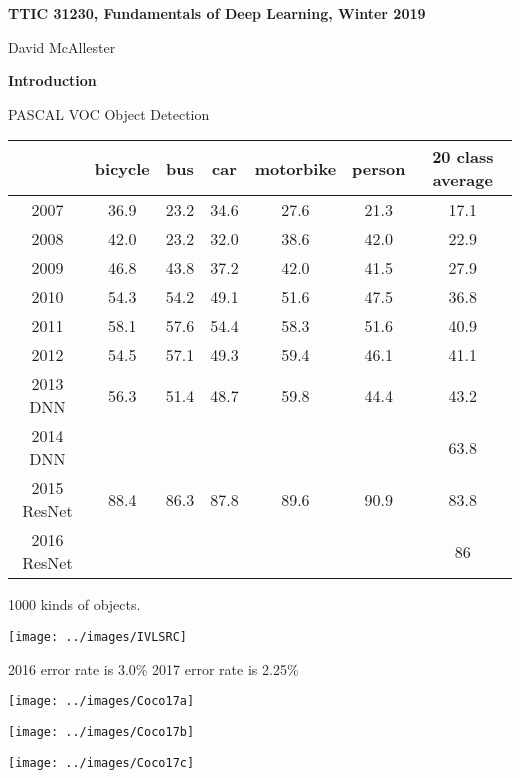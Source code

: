 {\huge
  \centerline{\bf TTIC 31230,  Fundamentals of Deep Learning, Winter 2019}
  \vfill
  \centerline{David McAllester}
  \vfill
  \centerline{\bf Introduction}



PASCAL VOC Object Detection

\vfill

\begin{center}
\begin{tabular}{|c|c|c|c|c|c|c|}
\hline
& bicycle & bus & car & motorbike & person & 20 class average \\
\hline
2007 & 36.9 & 23.2 & 34.6 &  27.6 &  21.3 &  17.1   \\
\hline 
2008 & 42.0 & 23.2 & 32.0 & 38.6 & 42.0 & 22.9   \\
\hline
2009 & 46.8 & 43.8 & 37.2 & 42.0 & 41.5 & 27.9 \\
\hline 
2010 & 54.3 & 54.2 & 49.1 & 51.6 & 47.5 & 36.8 \\
\hline
2011 & 58.1 & 57.6 & 54.4 & 58.3 & 51.6 & 40.9 \\
\hline
2012 & 54.5 & 57.1 & 49.3 & 59.4 & 46.1 & 41.1 \\
\hline
2013 DNN & 56.3 & 51.4 & 48.7 & 59.8 & 44.4 & 43.2 \\
\hline
2014 DNN & & & & & & 63.8 \\
\hline
2015 ResNet & 88.4 & 86.3 & 87.8 & 89.6 & 90.9 & 83.8 \\
\hline
2016 ResNet & &  & &  &  & 86 \\
\hline
\end{tabular}
\end{center}


1000 kinds of objects.

\vfill
\centerline{\texttt{[image: ../images/IVLSRC]}}

2016 error rate is 3.0\% \hspace{1.0in} 2017 error rate is 2.25\%


\centerline{\texttt{[image: ../images/Coco17a]}}



\centerline{\texttt{[image: ../images/Coco17b]}}



\centerline{\texttt{[image: ../images/Coco17c]}}

}
